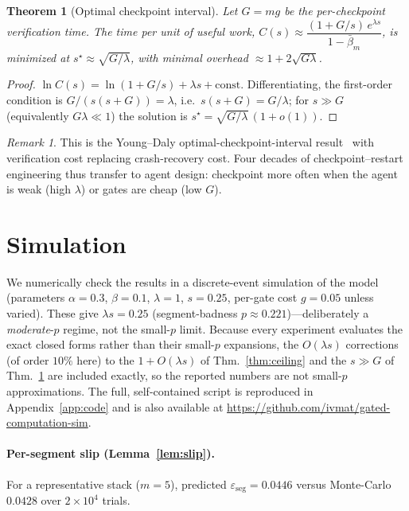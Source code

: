 \documentclass[11pt]{article}
\newtheorem{theorem}{Theorem}
\theoremstyle{remark}
\newtheorem{remark}{Remark}
\newcommand{\eseg}{\varepsilon_{\mathrm{seg}}}
\newcommand{\bm}{\bar\beta_m}
\begin{document}
\begin{theorem}[Optimal checkpoint interval]\label{thm:interval}
Let $G=mg$ be the per-checkpoint verification time. The time per unit of useful work,
$C(s)\approx\dfrac{(1+G/s)\,e^{\lambda s}}{1-\bm}$, is minimized at $s^\star\approx\sqrt{G/\lambda}$,
with minimal overhead $\approx 1+2\sqrt{G\lambda}$.
\end{theorem}
\begin{proof}
$\ln C(s)=\ln(1+G/s)+\lambda s+\text{const}$. Differentiating, the first-order condition is
$G/(s(s+G))=\lambda$, i.e.\ $s(s+G)=G/\lambda$; for $s\gg G$ (equivalently $G\lambda\ll1$) the
solution is $s^\star=\sqrt{G/\lambda}\,(1+o(1))$.
\end{proof}
\begin{remark}\label{rem:youngdaly}
This is the Young--Daly optimal-checkpoint-interval result~\cite{young1974,daly2006} with
verification cost replacing crash-recovery cost.
Four decades of checkpoint--restart engineering
thus transfer to agent design: checkpoint more often when the agent is weak (high $\lambda$) or
gates are cheap (low $G$).
\end{remark}

\section{Simulation}\label{sec:simulation}
We numerically check the results in a discrete-event simulation of the model (parameters $\alpha=0.3$,
$\beta=0.1$, $\lambda=1$, $s=0.25$, per-gate cost $g=0.05$ unless varied).
These give $\lambda s=0.25$ (segment-badness $p\approx0.221$)---deliberately a \emph{moderate}-$p$
regime, not the small-$p$ limit. Because every experiment evaluates the exact closed forms rather
than their small-$p$ expansions, the $O(\lambda s)$ corrections (of order $10\%$ here) to the
$1+O(\lambda s)$ of Thm.~\ref{thm:ceiling} and the $s\gg G$ of Thm.~\ref{thm:interval} are included
exactly, so the reported numbers are not small-$p$ approximations.
The full,
self-contained script is reproduced in Appendix~\ref{app:code} and is also available at
\url{https://github.com/ivmat/gated-computation-sim}.

\paragraph{Per-segment slip (Lemma~\ref{lem:slip}).} For a representative stack ($m=5$), predicted
$\eseg=0.0446$ versus Monte-Carlo $0.0428$ over $2\times10^4$ trials.
\end{document}
